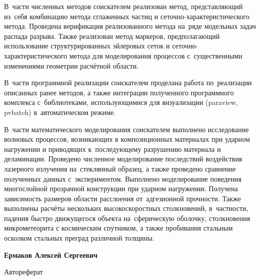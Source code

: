 \documentclass[a4paper,14pt]{extarticle}
\numberwithin{equation}{section}
\begin{document}
    В~части численных методов соискателем реализован метод, представляющий из~себя комбинацию метода сглаженных частиц и
    сеточно-ха\-рак\-те\-рис\-ти\-чес\-ко\-го метода. Проведена верификация реализованного метода на~ряде модельных задач
    распада разрыва. Также реализован метод маркеров, предполагающий использование структурированных эйлеровых сеток и
    сеточно-характеристического метода для моделирования процессов с~существенными изменениями геометрии расчётной
    области.

    В~части программной реализации соискателем проделана работа по~реализации описанных ранее методов, а также
    интеграции полученного программного комплекса с~библиотеками, использующимися для визуализации (paraview, pvbatch)
    в~автоматическом режиме.

    В~части математического моделирования соискателем выполнено исследование волновых процессов, возникающих в
    композиционных материалах при ударном нагружении и приводящих к~последующему разрушению материала и деламинации.
    Проведено численное моделирование последствий воздействия лазерного излучения на~стеклянный образец, а также
    проведено сравнение полученных данных с~экспериментом. Выполнено моделирование поведения многослойной прозрачной
    конструкции при ударном нагружении. Получена зависимость размеров области расслоения от~адгезионной прочности. Также
    выполнены расчёты нескольких высокоскоростных столкновений, в~частности, падения быстро движущегося объекта на~сферическую
    оболочку, столкновения микрометеорита с космическим спутником, а также пробивания стальным осколком стальных преград различной толщины.

    \newpage
    \begin{center}\end{center}
    \vspace{24em}

    \begin{center}
        \textbf{Ермаков Алексей Сергеевич}
    \end{center}

    \vspace{1em}

    \begin{center}
        \textsc{\textbf{\disser}}
    \end{center}

    \vspace{0.5em}

    \begin{center}
        Автореферат
    \end{center}
\end{document}
